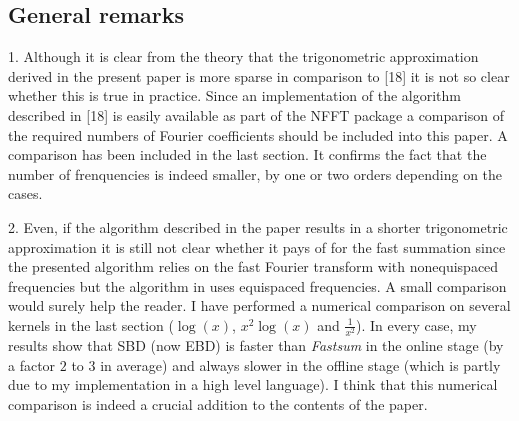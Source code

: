 \documentclass[10pt]{article}
\begin{document}
	
	\subsection*{General remarks}
	
	\begin{response}{1. Although it is clear from the theory that the trigonometric approximation derived in the present paper is more sparse in comparison to [18] it is not so clear whether this is true in practice. Since an implementation of the algorithm described in [18] is easily available as part of the NFFT package a comparison of the required numbers of Fourier coefficients should be included into this paper.}
	A comparison has been included in the last section. It confirms the fact that the number of frenquencies is indeed smaller, by one or two orders depending on the cases. 
	\end{response}
	\begin{response}{2. Even, if the algorithm described in the paper results in a shorter trigonometric approximation it is still not clear whether it pays of for the fast summation since the presented algorithm relies on the fast Fourier transform with nonequispaced frequencies but the algorithm in \cite{potts2004fast} uses equispaced frequencies. A small comparison would surely help the reader.}
	I have performed a numerical comparison on several kernels in the last section ($\log(x)$, $x^2 \log(x)$ and $\frac{1}{x^2}$). In every case, my results show that SBD (now EBD) is faster than \textit{Fastsum} in the online stage (by a factor $2$ to $3$ in average) and always slower in the offline stage (which is partly due to my implementation in a high level language). I think that this numerical comparison is indeed a crucial addition to the contents of the paper. 
	\end{response}
\end{document}
